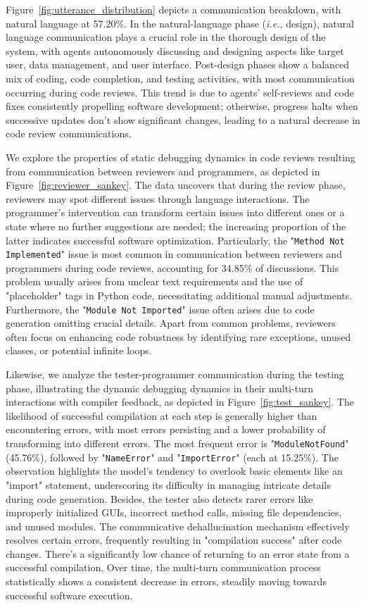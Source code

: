 \documentclass[11pt]{article}
\newcommand{\ie}{\textit{i.e., }}
\begin{document}
Figure~\ref{fig:utterance_distribution} depicts a communication breakdown, with natural language at 57.20\%.
In the natural-language phase (\ie design), natural language communication plays a crucial role in the thorough design of the system, with agents autonomously discussing and designing aspects like target user, data management, and user interface.
Post-design phases show a balanced mix of coding, code completion, and testing activities, with most communication occurring during code reviews.
This trend is due to agents' self-reviews and code fixes consistently propelling software development; otherwise, progress halts when successive updates don't show significant changes, leading to a natural decrease in code review communications.

We explore the properties of static debugging dynamics in code reviews resulting from communication between reviewers and programmers, as depicted in Figure~\ref{fig:reviewer_sankey}.
The data uncovers that during the review phase, reviewers may spot different issues through language interactions. 
The programmer's intervention can transform certain issues into different ones or a state where no further suggestions are needed; the increasing proportion of the latter indicates successful software optimization.
Particularly, the "\texttt{Method Not Implemented}" issue is most common in communication between reviewers and programmers during code reviews, accounting for 34.85\% of discussions. This problem usually arises from unclear text requirements and the use of "placeholder" tags in Python code, necessitating additional manual adjustments.
Furthermore, the "\texttt{Module Not Imported}" issue often arises due to code generation omitting crucial details.
Apart from common problems, reviewers often focus on enhancing code robustness by identifying rare exceptions, unused classes, or potential infinite loops.

Likewise, we analyze the tester-programmer communication during the testing phase, illustrating the dynamic debugging dynamics in their multi-turn interactions with compiler feedback, as depicted in Figure~\ref{fig:test_sankey}.
The likelihood of successful compilation at each step is generally higher than encountering errors, with most errors persisting and a lower probability of transforming into different errors.
The most frequent error is "\texttt{ModuleNotFound}" (45.76\%), followed by "\texttt{NameError}" and "\texttt{ImportError}" (each at 15.25\%).
The observation highlights the model's tendency to overlook basic elements like an "import" statement, underscoring its difficulty in managing intricate details during code generation.
Besides, the tester also detects rarer errors like improperly initialized GUIs, incorrect method calls, missing file dependencies, and unused modules. 
The communicative dehallucination mechanism effectively resolves certain errors, frequently resulting in "compilation success" after code changes. There's a significantly low chance of returning to an error state from a successful compilation. Over time, the multi-turn communication process statistically shows a consistent decrease in errors, steadily moving towards successful software execution.
\end{document}

